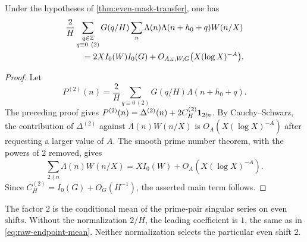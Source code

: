\begin{corollary}
\label{cor:even-prime-pair-mean}
Under the hypotheses of \cref{thm:even-mask-transfer}, one has
\begin{align}
 &\frac2H\sum_{\substack{q\in\mathbb Z\\q\equiv0\ (2)}}G(q/H)
 \sum_n\Lambda(n)\Lambda(n+h_0+q)W(n/X)
 \notag\\
 &\qquad={}
 2XI_0(W)I_0(G)+O_{A,\varepsilon,W,G}
 \bigl(X(\log X)^{-A}\bigr).
 \label{eq:even-prime-pair-mean}
\end{align}
\end{corollary}

\begin{proof}
Let
\[
 P^{(2)}(n)=
 \frac2H\sum_{q\equiv0\ (2)}
 G(q/H)\Lambda(n+h_0+q).
\]
The preceding proof gives
$P^{(2)}(n)=\Delta^{(2)}(n)+2C_H^{(2)}\mathbf 1_{2\nmid n}$.
By Cauchy--Schwarz, the contribution of $\Delta^{(2)}$ against
$\Lambda(n)W(n/X)$ is $O_A(X(\log X)^{-A})$ after requesting a larger
value of $A$.  The smooth prime number theorem, with the powers of $2$
removed, gives
\[
 \sum_{2\nmid n}\Lambda(n)W(n/X)
 =XI_0(W)+O_A(X(\log X)^{-A}).
\]
Since $C_H^{(2)}=I_0(G)+O_G(H^{-1})$, the asserted main term follows.
\end{proof}

The factor $2$ is the conditional mean of the prime-pair singular series on
even shifts.  Without the normalization $2/H$, the leading coefficient is
$1$, the same as in \eqref{eq:raw-endpoint-mean}.  Neither normalization
selects the particular even shift $2$.

